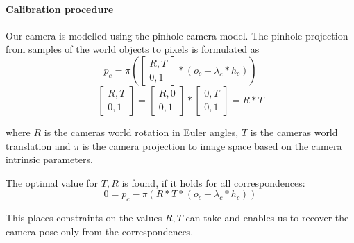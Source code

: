 
\paragraph{Calibration procedure}
  
Our camera is modelled using the pinhole camera model. 
The pinhole projection from samples of the world objects to pixels is formulated as
\begin{equation}
  \label{eq:static_calibration_reprojection}
  p_c = \pi \left(  
    \begin{bmatrix}
      R, T \\
      0, 1
    \end{bmatrix} *
    (o_c + \lambda_c * h_c)
  \right)
\end{equation}
\begin{equation}
    \begin{bmatrix}
      R, T \\
      0, 1
    \end{bmatrix} = 
    \begin{bmatrix}
      R, 0 \\
      0, 1
    \end{bmatrix} *
    \begin{bmatrix}
      0, T \\
      0, 1
    \end{bmatrix} =
    R * T
\end{equation}

where $R$ is the cameras world rotation in Euler angles, $T$ is the cameras world translation and $\pi$ is the camera projection to image space based on the camera intrinsic parameters.

The optimal value for $T,R$ is found, if it holds for all correspondences:
\begin{equation}
  0 = p_c - \pi \left( R * T * (o_c + \lambda_c * h_c)\right)
\end{equation}

This places constraints on the values $R, T$ can take and enables us to recover the camera pose only from the correspondences.

